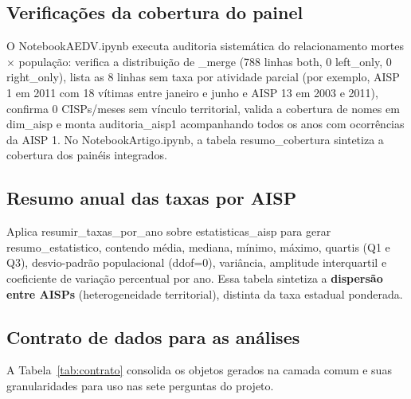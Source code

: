 \documentclass[11pt,a4paper]{article}
\newcommand{\code}[1]{{\ttfamily\footnotesize\allowbreak #1}}
\begin{document}
\subsection{Verificações da cobertura do painel}
O \code{NotebookAEDV.ipynb} executa auditoria sistemática do relacionamento mortes $\times$ população: verifica a distribuição de \code{\_merge} (788 linhas \code{both}, 0 \code{left\_only}, 0 \code{right\_only}), lista as 8 linhas sem taxa por atividade parcial (por exemplo, AISP 1 em 2011 com 18 vítimas entre janeiro e junho e AISP 13 em 2003 e 2011), confirma 0 CISPs/meses sem vínculo territorial, valida a cobertura de nomes em \code{dim\_aisp} e monta \code{auditoria\_aisp1} acompanhando todos os anos com ocorrências da AISP 1. No \code{NotebookArtigo.ipynb}, a tabela \code{resumo\_cobertura} sintetiza a cobertura dos painéis integrados.

\subsection{Resumo anual das taxas por AISP}
Aplica \code{resumir\_taxas\_por\_ano} sobre \code{estatisticas\_aisp} para gerar \code{resumo\_estatistico}, contendo média, mediana, mínimo, máximo, quartis (Q1 e Q3), desvio-padrão populacional (\code{ddof=0}), variância, amplitude interquartil e coeficiente de variação percentual por ano. Essa tabela sintetiza a \textbf{dispersão entre AISPs} (heterogeneidade territorial), distinta da taxa estadual ponderada.

\subsection{Contrato de dados para as análises}
A Tabela~\ref{tab:contrato} consolida os objetos gerados na camada comum e suas granularidades para uso nas sete perguntas do projeto.
\end{document}
